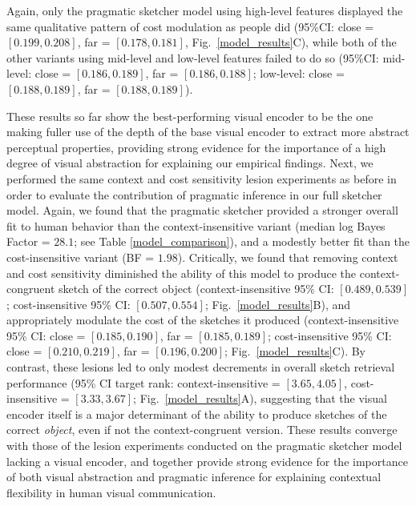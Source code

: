\documentclass[9pt,twocolumn,twoside]{pnas-new}
\newcommand{\ndg}[1]{\textcolor{Green}{[ndg: #1]}}
\begin{document}
Again, only the pragmatic sketcher model using high-level features displayed the same qualitative pattern of cost modulation as people did (95\%CI: close = $[0.199, 0.208]$, far = $[0.178, 0.181]$, Fig.~\ref{model_results}C), while both of the other variants using mid-level and low-level features failed to do so (95\%CI: mid-level: close = $[0.186, 0.189]$, far = $[0.186, 0.188]$; low-level: close = $[0.188, 0.189]$, far = $[0.188, 0.189]$).  

These results so far show the best-performing visual encoder to be the one making fuller use of the depth of the base visual encoder to extract more abstract perceptual properties, providing strong evidence for the importance of a high degree of visual abstraction for explaining our empirical findings. 
Next, we performed the same context and cost sensitivity lesion experiments as before in order to evaluate the contribution of pragmatic inference in our full sketcher model. 
Again, we found that the pragmatic sketcher provided a stronger overall fit to human behavior than the context-insensitive variant (median log Bayes Factor = $28.1$; see Table \ref{model_comparison}), and a modestly better fit than the cost-insensitive variant (BF = $1.98$). 
Critically, we found that removing context and cost sensitivity diminished the ability of this model to produce the context-congruent sketch of the correct object (context-insensitive 95\% CI: $[0.489, 0.539]$; cost-insensitive 95\% CI: $[0.507, 0.554]$; Fig.~\ref{model_results}B), and appropriately modulate the cost of the sketches it produced (context-insensitive 95\% CI: close = $[0.185, 0.190]$, far = $[0.185, 0.189]$; cost-insensitive 95\% CI: close = $[0.210, 0.219]$, far = $[0.196, 0.200]$; Fig.~\ref{model_results}C). 
By contrast, these lesions led to only modest decrements in overall sketch retrieval performance (95\% CI target rank: context-insensitive = $[3.65, 4.05]$, cost-insensitive = $[3.33, 3.67]$;  Fig.~\ref{model_results}A), suggesting that the visual encoder itself is a major determinant of the ability to produce sketches of the correct \textit{object}, even if not the context-congruent version.
These results converge with those of the lesion experiments conducted on the pragmatic sketcher model lacking a visual encoder, and together provide strong evidence for the importance of both visual abstraction and pragmatic inference for explaining contextual flexibility in human visual communication. 

\end{document}

